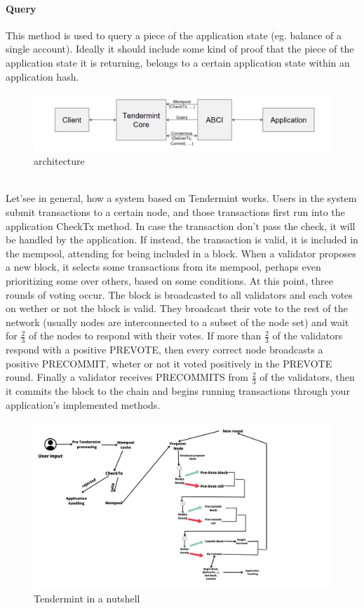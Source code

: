 \documentclass{article}
\begin{document}
	\paragraph{Query}
	This method is used to query a piece of the application state (eg. balance of a single account). Ideally it should include some kind of proof that the piece of the application state it is returning, belongs to a certain application state within an application hash. \\
	\begin{figure}[htbp]
    \centering
    \includegraphics[width=1\textwidth]{im1} 
    \caption{architecture}
	\end{figure}\\
    Let'see in general, how a system based on Tendermint works. Users in the system submit transactions to a certain node, and those transactions first run into the application CheckTx method. In case the transaction don't pass the check, it will be handled by the application. If instead, the transaction is valid, it is included in the mempool, attending for being included in a block. When a validator proposes a new block, it selects some transactions from its mempool, perhaps even prioritizing some over others, based on some conditions. At this point, three rounds of voting occur. The block is broadcasted to all validators and each votes on wether or not the block is valid. They broadcast their vote to the rest of the network (usually nodes are interconnected to a subset of the node set) and wait for $\frac{2}{3}$ of the nodes to respond with their votes. If more than $\frac{2}{3}$ of the validators respond with a positive PREVOTE, then every correct node broadcasts a positive PRECOMMIT, wheter or not it voted positively in the PREVOTE round. Finally a validator receives PRECOMMITS from $\frac{2}{3}$ of the validators, then it commits the block to the chain and begins running transactions through your application's implemented methods.
	\begin{figure}[htbp]
    \centering
    \includegraphics[width=1\textwidth]{Userinput} 
	\caption{Tendermint in a nutshell}
\end{figure}\\
\newpage
\end{document}
